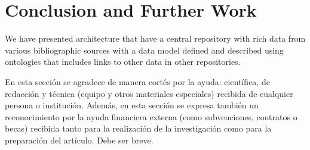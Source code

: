 \documentclass[11pt]{article}
\begin{document}


\section{Conclusion and Further Work}
\label{label:conlusionsfurtherwork}
We have presented architecture that have a central repository with rich data from various bibliographic sources with a data model defined and described using ontologies that includes links to other data in other repositories. 



\begin{acknowledgements} 
  En esta sección se agradece de manera cortés por la ayuda: científica, de redacción y 
técnica (equipo y otros materiales especiales) recibida de cualquier persona o institución. Además, en 
esta sección se expresa también un reconocimiento por la ayuda financiera externa (como 
subvenciones, contratos o becas) recibida tanto para la realización de la investigación como para la 
preparación del artículo. Debe ser breve.
\end{acknowledgements}





\end{document}
